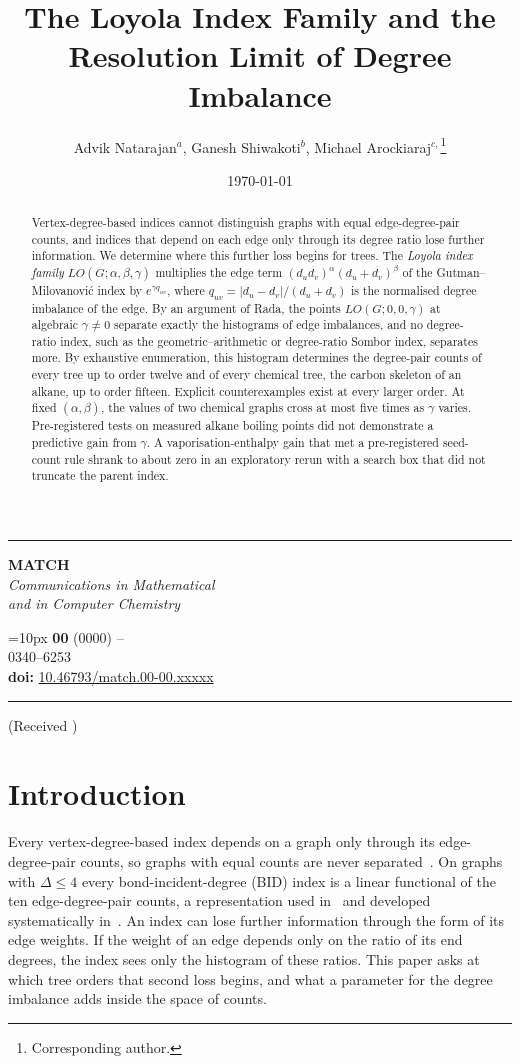 \documentclass[a5paper, 10pt]{article}
\title{The Loyola Index Family and the Resolution Limit of Degree Imbalance}
\author{Advik Natarajan$^{a}$, Ganesh Shiwakoti$^{b}$, Michael Arockiaraj$^{c,}$\footnote{Corresponding author.}}
\date{\today}
\makeatletter
\theoremstyle{plain}
\theoremstyle{remark}
\theoremstyle{definition}
\renewcommand{\maketitle}{
	\begin{center}
    \rule[.2em]{\textwidth}{0.353mm}
		\begin{minipage}[m]{0.35\textwidth}
			{\scriptsize
				\begin{center}
					\textsf{\textbf{\huge MATCH}\\
						\textit{Communications in Mathematical\\
							and in Computer Chemistry}
					}
			\end{center}}
		\end{minipage}\hfill
		\begin{minipage}[m]{0.65\textwidth}
			\begin{flushright}
				\baselineskip=10px
				{\scriptsize\sffamily{\itshape  MATCH Commun. Math. Comput. Chem.}
				\textbf{\vol{}}
				(\pubyear)
					\thepage--\pageref{LastPage}}\\
				{\scriptsize\sffamily {\bfseries ISSN:} 0340--6253}\\
				{\scriptsize\sffamily \textbf{doi:} \doi{10.46793/match.\vol-\num.\id}}
			\end{flushright}
		\end{minipage}
		\rule[1em]{\textwidth}{.353mm}
		\baselineskip=0.30in
		{\Large\bfseries \@title} \par
		\vspace{5mm}
		\baselineskip=0.2in
		{\large\bfseries \@author}\par
		\vspace{1mm}
		{\it \@address} \par
		{\small\tt \@email} \par
		\vspace{3mm}
		{\small (Received \@date)} \par
	\end{center}
	\vspace{3mm}
}
\newcommand{\doi}[1]{\href{https://doi.org/#1}{#1}}
\newcommand{\vol}{00}
\newcommand{\num}{00}
\newcommand{\pubyear}{0000}
\newcommand{\id}{xxxxx}
\makeatother
\begin{document}
\maketitle

\begin{abstract}%
  Vertex-degree-based indices cannot distinguish graphs with equal
  edge-degree-pair counts, and indices that depend on each edge only
  through its degree ratio lose further information. We determine where
  this further loss begins for trees. The \emph{Loyola index family}
  $LO(G;\alpha,\beta,\gamma)$ multiplies the edge term
  $(d_u d_v)^{\alpha} (d_u + d_v)^{\beta}$ of the Gutman--Milovanovi\'c
  index by $e^{\gamma q_{uv}}$, where $q_{uv} = |d_u - d_v|/(d_u + d_v)$
  is the normalised degree imbalance of the edge. By an argument of Rada, the
  points $LO(G;0,0,\gamma)$ at algebraic $\gamma \neq 0$ separate exactly the
  histograms of edge imbalances, and no degree-ratio index, such as the
  geometric--arithmetic or degree-ratio Sombor index, separates more. By
  exhaustive enumeration, this histogram determines the degree-pair counts
  of every tree up to order twelve and of every chemical tree, the carbon
  skeleton of an alkane, up to order fifteen. Explicit counterexamples
  exist at every larger order. At fixed $(\alpha,\beta)$, the values of two chemical
  graphs cross at most five times as $\gamma$ varies. Pre-registered tests on measured alkane
  boiling points did not demonstrate a predictive gain from $\gamma$. A
  vaporisation-enthalpy gain that met a pre-registered seed-count rule
  shrank to about zero in an exploratory rerun with a search box that did
  not truncate the parent index.
\end{abstract}

\onehalfspacing

\section{Introduction}\label{sec:intro}

  Every vertex-degree-based index depends on a graph only through its
  edge-degree-pair counts, so graphs with equal counts are never
  separated~\cite{Rada2026LinearVDB}. On graphs with $\Delta \le 4$ every bond-incident-degree (BID) index is a linear functional
  of the ten edge-degree-pair counts, a representation used
  in~\cite{Rada2019ExpVDB, RadaRodriguezSigarreta2022Weak} and developed
  systematically in~\cite{Rada2026LinearVDB}. An index can lose further
  information through the form of its edge weights. If the weight of an
  edge depends only on the ratio of its end degrees, the index sees only
  the histogram of these ratios. This paper asks at which tree orders that
  second loss begins, and what a parameter for the degree imbalance adds
  inside the space of counts.
\end{document}
